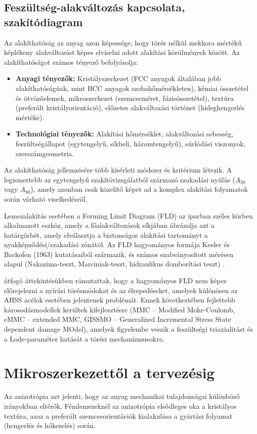 \documentclass[12pt,a4paper,oneside]{report}
\begin{document}
\subsection{Feszültség-alakváltozás kapcsolata, szakítódiagram}
Az alakíthatóság az anyag azon képessége, hogy törés nélkül mekkora mértékű képlékeny alakváltozást képes elviselni adott alakítási körülmények között. Az alakíthatóságot számos tényező befolyásolja:
\begin{itemize}
    \item \textbf{Anyagi tényezők:} Kristályszerkezet (FCC anyagok általában jobb alakíthatóságúak, mint BCC anyagok szobahőmérsékleten), kémiai összetétel és ötvözőelemek, mikroszerkezet (szemcseméret, fázisösszetétel), textúra (preferált kristályorientáció), előzetes alakváltozási történet (hideghengerlés mértéke).
    \item \textbf{Technológiai tényezők:} Alakítási hőmérséklet, alakváltozási sebesség, feszültségállapot (egytengelyű, síkbeli, háromtengelyű), súrlódási viszonyok, szerszámgeometria.
\end{itemize}
Az alakíthatóság jellemzésére több kísérleti módszer és kritérium létezik. A legismertebb az egytengelyű szakítóvizsgálatból származó szakadási nyúlás ($A_{50}$ vagy $A_{80}$), amely azonban csak közelítő képet ad a komplex alakítási folyamatok során várható viselkedésről.

Lemezalakítás esetében a Forming Limit Diagram (FLD) az iparban széles körben alkalmazott eszköz, amely a főalakváltozások síkjában ábrázolja azt a határgörbét, amely elválasztja a biztonságos alakítási tartományt a nyakképződési/szakadási zónától. Az FLD hagyományos formája Keeler és Backofen (1963) kutatásaiból származik, és számos szabványosított mérésen alapul (Nakazima-teszt, Marciniak-teszt, hidraulikus domborítási teszt) \cite{Marciniak2002}.

\cite{Takalkar2019} átfogó áttekintésükben rámutattak, hogy a hagyományos FLD nem képes előrejelezni a nyírási törésmódokat és az élrepedéseket, amelyek különösen az AHSS acélok esetében jelentenek problémát. Ennek következtében fejlettebb károsodásmodellek kerültek kifejlesztésre (MMC – Modified Mohr-Coulomb, eMMC – extended MMC, GISSMO – Generalized Incremental Stress State dependent damage MOdel), amelyek figyelembe veszik a feszültségi triaxialitást és a Lode-paraméter hatását a törési mechanizmusokra.

\section{Mikroszerkezettől a tervezésig}
Az anizotrópia azt jelenti, hogy az anyag mechanikai tulajdonságai különböző irányokban eltérők. Fémlemezeknél az anizotrópia elsődleges oka a kristályos textúra, azaz a preferált szemcseorientációk kialakulása a gyártási folyamat (hengerlés és hőkezelés) során.
\end{document}
